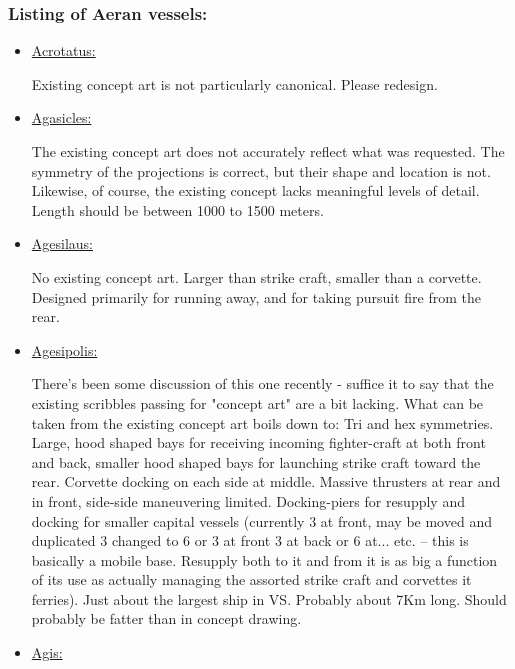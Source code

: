 \subsubsection{Listing of Aeran vessels:}

\begin{itemize}
\item \href{http://vegastrike.sourceforge.net/wiki/Vessel:Acrotatus}{Acrotatus:} 

Existing concept art is not particularly canonical. Please redesign.


\item \href{http://vegastrike.sourceforge.net/wiki/Vessel:Agasicles}{Agasicles:}

The existing concept art does not accurately reflect what was
requested. The symmetry of the projections is correct, but their shape
and location is not. Likewise, of course, the existing concept lacks
meaningful levels of detail. Length should be between 1000 to 1500
meters.

\item \href{http://vegastrike.sourceforge.net/wiki/Vessel:Agesilaus}{Agesilaus:}

No existing concept art. Larger than strike craft, smaller than a
corvette. Designed primarily for running away, and for taking pursuit
fire from the rear.

\item \href{http://vegastrike.sourceforge.net/wiki/Vessel:Agesipolis}{Agesipolis:}

There's been some discussion of this one recently - suffice it to say
that the existing scribbles passing for "concept art" are a bit
lacking. What can be taken from the existing concept art boils down
to: Tri and hex symmetries. Large, hood shaped bays for receiving
incoming fighter-craft at both front and back, smaller hood shaped
bays for launching strike craft toward the rear. Corvette docking on
each side at middle. Massive thrusters at rear and in front, side-side
maneuvering limited. Docking-piers for resupply and docking for
smaller capital vessels (currently 3 at front, may be moved and
duplicated 3 changed to 6 or 3 at front 3 at back or 6 at... etc. -- this is
basically a mobile base. Resupply both to it and from it is as big a
function of its use as actually managing the assorted strike craft and
corvettes it ferries). Just about the largest ship in VS. Probably
about 7Km long. Should probably be fatter than in concept drawing.


\item \href{http://vegastrike.sourceforge.net/wiki/Vessel:Agis}{Agis:}


\end{itemize}

